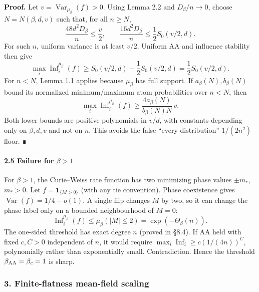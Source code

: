 \textbf{Proof.} Let \(v=\operatorname{Var}_{\mu_\beta}(f)>0\). Using Lemma 2.2 and \(D_\beta/n\to0\), choose \(N=N(\beta,d,v)\) such that, for all \(n\ge N\),
\[\frac{48d^2D_\beta}{n}\le\frac v2,
\qquad
\frac{16d^2D_\beta}{n}\le\frac12S_0(v/2,d).\]
For such \(n\), uniform variance is at least \(v/2\). Uniform AA and influence stability then give
\[\max_i\operatorname{Inf}_i^{\mu_\beta}(f)
\ge S_0(v/2,d)-\frac12S_0(v/2,d)
=\frac12S_0(v/2,d).\]
For \(n<N\), Lemma 1.1 applies because \(\mu_\beta\) has full support. If \(a_\beta(N),b_\beta(N)\) bound its normalized minimum/maximum atom probabilities over \(n<N\), then
\[\max_i\operatorname{Inf}_i^{\mu_\beta}(f)
\ge \frac{4a_\beta(N)}{b_\beta(N)N}\,v.\]
Both lower bounds are positive polynomials in \(v/d\), with constants depending only on \(\beta,d,v\) and not on \(n\). This avoids the false ``every distribution'' \(1/(2n^2)\) floor. ∎

\paragraph{\texorpdfstring{2.5 Failure for \(\beta>1\)}{2.5 Failure for \textbackslash beta\textgreater1}}\label{failure-for-beta1}

For \(\beta>1\), the Curie--Weiss rate function has two minimizing phase values \(\pm m_*\), \(m_*>0\). Let \(f=\mathbf1_{\{M>0\}}\) (with any tie convention). Phase coexistence gives \(\operatorname{Var}(f)=1/4-o(1)\). A single flip changes \(M\) by two, so it can change the phase label only on a bounded neighbourhood of \(M=0\):
\[\operatorname{Inf}_i^{\mu_\beta}(f)\le\mu_\beta(|M|\le2)
=\exp(-\Theta_\beta(n)).\]
The one-sided threshold has exact degree \(n\) (proved in §8.4). If AA held with fixed \(c,C>0\) independent of \(n\), it would require \(\max_i\operatorname{Inf}_i\ge c(1/(4n))^C\), polynomially rather than exponentially small. Contradiction. Hence the threshold \(\beta_{\rm AA}=\beta_c=1\) is sharp.

\subsubsection{3. Finite-flatness mean-field scaling}\label{finite-flatness-mean-field-scaling}

